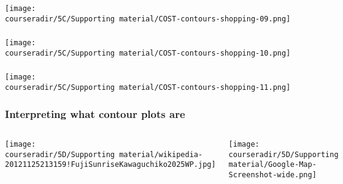 \documentclass[11pt,aspectratio=169,mathserif]{beamer}
\begin{document}
\begin{frame}\frametitle{}
	\centerline{\texttt{[image: \\courseradir/5C/Supporting material/COST-contours-shopping-09.png]}}
\end{frame}
\begin{frame}\frametitle{}
	\centerline{\texttt{[image: \\courseradir/5C/Supporting material/COST-contours-shopping-10.png]}}
\end{frame}
\begin{frame}\frametitle{}
	\centerline{\texttt{[image: \\courseradir/5C/Supporting material/COST-contours-shopping-11.png]}}
\end{frame}
\begin{frame}\frametitle{Interpreting what contour plots are}
	\begin{columns}[b]
			\centerline{\texttt{[image: \\courseradir/5D/Supporting material/wikipedia-20121125213159!FujiSunriseKawaguchiko2025WP.jpg]}}
			
		
			\centerline{\texttt{[image: \\courseradir/5D/Supporting material/Google-Map-Screenshot-wide.png]}}

	\end{columns}
\end{frame}
\end{document}
